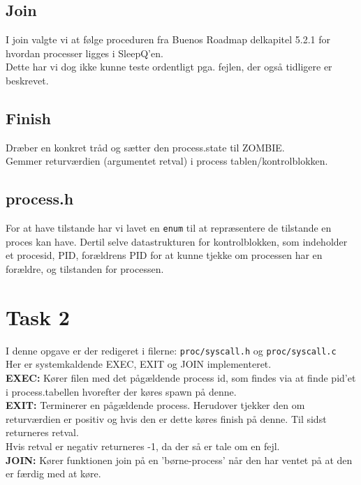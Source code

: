 \documentclass[a4paper,12pt]{article}
\begin{document}
\subsection*{Join}
I join valgte vi at følge proceduren fra Buenos Roadmap delkapitel 5.2.1 for hvordan processer ligges i SleepQ'en. \\
Dette har vi dog ikke kunne teste ordentligt pga. fejlen, der også tidligere er beskrevet.


\subsection*{Finish}
Dræber en konkret tråd og sætter den process.state til ZOMBIE. 
\\
Gemmer returværdien (argumentet retval) i process tablen/kontrolblokken. 

\subsection*{process.h}
For at have tilstande har vi lavet en \texttt{enum} til at repræsentere de tilstande en proces kan have. Dertil selve datastrukturen for kontrolblokken, som indeholder et procesid, PID, forældrens PID for at kunne tjekke om processen har en forældre, og tilstanden for processen.


\section*{Task 2}
I denne opgave er der redigeret i filerne: \texttt{proc/syscall.h} og \texttt{proc/syscall.c}
\\[5px]
Her er systemkaldende EXEC, EXIT og JOIN implementeret. 
\\[5px]
\textbf{EXEC:} Kører filen med det pågældende process id, som findes via at finde pid'et i process.tabellen hvorefter der køres spawn på denne. 
\\
\textbf{EXIT:} Terminerer en pågældende process. Herudover tjekker den om returværdien er positiv og hvis den er dette køres finish på denne. Til sidst returneres retval.
\\
Hvis retval er negativ returneres -1, da der så er tale om en fejl.
\\
\textbf{JOIN:}
Kører funktionen join på en 'børne-process' når den har ventet på at den er færdig med at køre.
\end{document}
